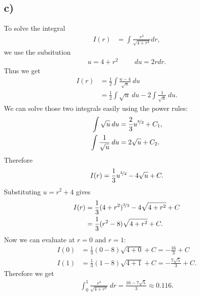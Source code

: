 \documentclass{article}
\begin{document}
\subsection*{c)}
To solve the integral
\begin{align*}
  I(r)&= \int \frac{r^3}{\sqrt{4+r^2}}dr,
\end{align*}
we use the subsitution
\begin{align*}
  u = 4+r^2 \hspace{1cm}  du = 2rdr.
\end{align*}
Thus we get 
\begin{align*}
  I(r) &= \frac{1}{2}\int \frac{u-4}{\sqrt{u}}\:du\\
  &=\frac{1}{2}\int\sqrt{u}\:du - 2 \int \frac{1}{\sqrt{u}}\:du.
\end{align*}
We can solve those two integrals easily using the power rules:
\begin{align*}
  \int \sqrt{u}\:du&=\frac{2}{3}u^{\nicefrac{3}{2}}+C_1,\\
  \int \frac{1}{\sqrt{u}}\:du &=2\sqrt{u}+C_2.
\end{align*}
Therefore
\begin{align*}
  I(r) = \frac{1}{3}u^{\nicefrac{3}{2}}-4\sqrt{u}+C.
\end{align*}
Substituting $u=r^2+4$ gives
\begin{align*}
  I(r) &= \frac{1}{3}(4+r^2)^{\nicefrac{3}{2}}-4\sqrt{4+r^2} + C\\
  &= \frac{1}{3}(r^2-8)\sqrt{4+r^2}+C.
\end{align*}
Now we can evaluate at $r=0$ and $r=1$:
\begin{align*}
  I(0)&=\frac{1}{3}(0-8)\sqrt{4+0}+C=-\frac{16}{3}+C\\
  I(1)&=\frac{1}{3}(1-8)\sqrt{4+1}+C=-\frac{7\sqrt{5}}{3}+C.
\end{align*}
Therefore we get
\begin{align*}
  \int_0^1\frac{r^3}{\sqrt{4+r^2}}\:dr = \frac{16-7\sqrt{5}}{3} \approx 0.116.
\end{align*}
\end{document}
